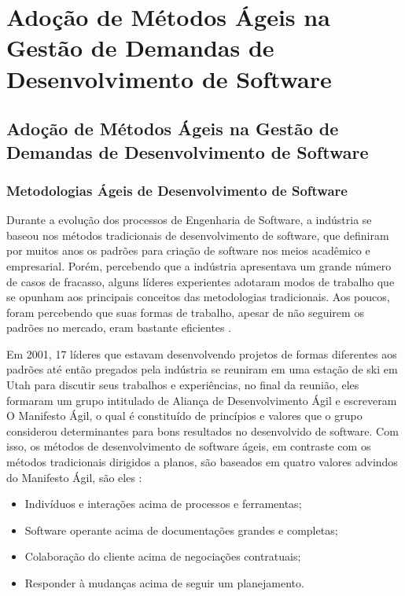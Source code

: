 \part{Adoção de Métodos Ágeis na Gestão de Demandas de Desenvolvimento de Software}

\chapter[Adoção de Métodos Ágeis na Gestão de Demandas de Desenvolvimento de Software]{Adoção de Métodos Ágeis na Gestão de Demandas de Desenvolvimento de Software}

\section[Metodologias Ágeis de Desenvolvimento de Software]{Metodologias Ágeis de Desenvolvimento de Software}

Durante a evolução dos processos de Engenharia de Software, a indústria se baseou nos métodos tradicionais de desenvolvimento de software, que definiram por muitos anos os padrões para criação de software nos meios acadêmico e empresarial. Porém, percebendo que a indústria apresentava um grande número de casos de fracasso, alguns líderes experientes adotaram modos de trabalho que se opunham aos principais conceitos das metodologias tradicionais. Aos poucos, foram percebendo que suas formas de trabalho, apesar de não seguirem os padrões no mercado, eram bastante eficientes   \cite{filho}. 

Em 2001, 17 líderes que estavam desenvolvendo projetos de formas diferentes aos padrões até então pregados pela indústria se reuniram em uma estação de ski em Utah para discutir seus trabalhos e experiências, no final da reunião, eles formaram um grupo intitulado de Aliança de Desenvolvimento Ágil e escreveram O Manifesto Ágil, o qual é constituído de princípios e valores que o grupo considerou determinantes para bons resultados no desenvolvido de software. Com isso, os métodos de desenvolvimento de software ágeis, em contraste com os métodos tradicionais dirigidos a planos, são baseados em quatro valores advindos do Manifesto Ágil, são eles \cite{manifesto}:
\begin{itemize}
\item Indivíduos e interações acima de processos e ferramentas;
\item Software operante acima de documentações grandes e completas;
\item Colaboração do cliente acima de negociações contratuais;
\item Responder à mudanças acima de seguir um planejamento.
\end{itemize}

